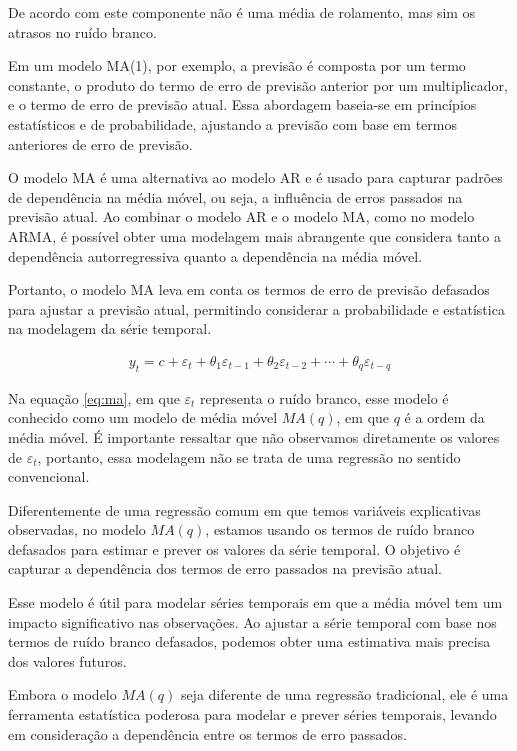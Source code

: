 De acordo com  este componente não é uma média de rolamento, mas sim os atrasos no ruído branco.

Em um modelo MA(1), por exemplo, a previsão é composta por um termo constante, o produto do termo de erro de previsão anterior por um multiplicador, e o termo de erro de previsão atual. Essa abordagem baseia-se em princípios estatísticos e de probabilidade, ajustando a previsão com base em termos anteriores de erro de previsão.

O modelo MA é uma alternativa ao modelo AR e é usado para capturar padrões de dependência na média móvel, ou seja, a influência de erros passados na previsão atual. Ao combinar o modelo AR e o modelo MA, como no modelo ARMA, é possível obter uma modelagem mais abrangente que considera tanto a dependência autorregressiva quanto a dependência na média móvel.

Portanto, o modelo MA leva em conta os termos de erro de previsão defasados para ajustar a previsão atual, permitindo considerar a probabilidade e estatística na modelagem da série temporal.


\begin{eqnarray}
	y_t=c+\varepsilon_t+\theta_1 \varepsilon_{t-1}+\theta_2 \varepsilon_{t-2}+\cdots+\theta_q \varepsilon_{t-q}\label{eq:ma}
\end{eqnarray}

Na equação \eqref{eq:ma}, em que $\varepsilon_t$ representa o ruído branco, esse modelo é conhecido como um modelo de média móvel $MA(q)$, em que $q$ é a ordem da média móvel. É importante ressaltar que não observamos diretamente os valores de $\varepsilon_t$, portanto, essa modelagem não se trata de uma regressão no sentido convencional.

Diferentemente de uma regressão comum em que temos variáveis explicativas observadas, no modelo $MA(q)$, estamos usando os termos de ruído branco defasados para estimar e prever os valores da série temporal. O objetivo é capturar a dependência dos termos de erro passados na previsão atual.

Esse modelo é útil para modelar séries temporais em que a média móvel tem um impacto significativo nas observações. Ao ajustar a série temporal com base nos termos de ruído branco defasados, podemos obter uma estimativa mais precisa dos valores futuros.

Embora o modelo $MA(q)$ seja diferente de uma regressão tradicional, ele é uma ferramenta estatística poderosa para modelar e prever séries temporais, levando em consideração a dependência entre os termos de erro passados.

